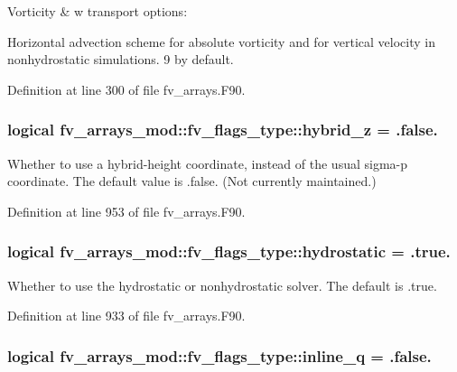 Vorticity \& w transport options\-: 

Horizontal advection scheme for absolute vorticity and for vertical velocity in nonhydrostatic simulations. 9 by default. 

Definition at line 300 of file fv\-\_\-arrays.\-F90.

\subsubsection[{hybrid\-\_\-z}]{\setlength{\rightskip}{0pt plus 5cm}logical fv\-\_\-arrays\-\_\-mod\-::fv\-\_\-flags\-\_\-type\-::hybrid\-\_\-z = .false.}\label{structfv__arrays__mod_1_1fv__flags__type_aaa7ad25f7078c86a27efa0fd14977092}


Whether to use a hybrid-\/height coordinate, instead of the usual sigma-\/p coordinate. The default value is .false. (Not currently maintained.) 



Definition at line 953 of file fv\-\_\-arrays.\-F90.

\subsubsection[{hydrostatic}]{\setlength{\rightskip}{0pt plus 5cm}logical fv\-\_\-arrays\-\_\-mod\-::fv\-\_\-flags\-\_\-type\-::hydrostatic = .true.}\label{structfv__arrays__mod_1_1fv__flags__type_a4430f93684114666ea35bb714210ab8c}


Whether to use the hydrostatic or nonhydrostatic solver. The default is .true. 



Definition at line 933 of file fv\-\_\-arrays.\-F90.

\subsubsection[{inline\-\_\-q}]{\setlength{\rightskip}{0pt plus 5cm}logical fv\-\_\-arrays\-\_\-mod\-::fv\-\_\-flags\-\_\-type\-::inline\-\_\-q = .false.}\label{structfv__arrays__mod_1_1fv__flags__type_a7630553d7bb9549c7092f49184a409cd}


